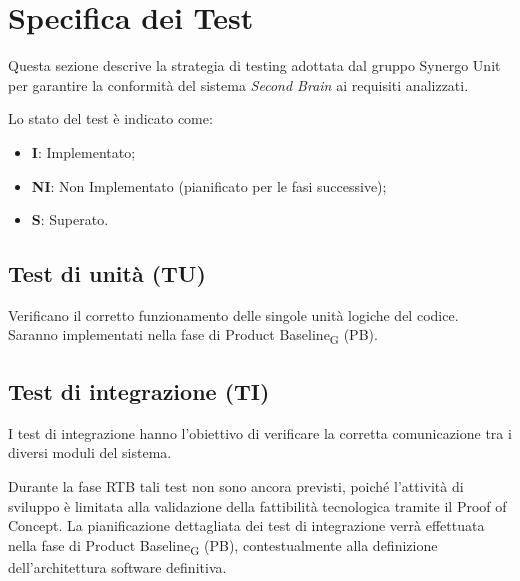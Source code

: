 
\section{Specifica dei Test}
Questa sezione descrive la strategia di testing adottata dal gruppo Synergo Unit per garantire la conformità del sistema \textit{Second Brain} ai requisiti analizzati.

Lo stato del test è indicato come:
\begin{itemize}
    \item \textbf{I}: Implementato;
    \item \textbf{NI}: Non Implementato (pianificato per le fasi successive);
    \item \textbf{S}: Superato.
\end{itemize}

\subsection{Test di unità (TU)}
Verificano il corretto funzionamento delle singole unità logiche del codice. Saranno implementati nella fase di Product Baseline\textsubscript{G} (PB).


\subsection{Test di integrazione (TI)}
I test di integrazione hanno l'obiettivo di verificare la corretta comunicazione tra i diversi moduli del sistema.

Durante la fase RTB tali test non sono ancora previsti, poiché l'attività di sviluppo è limitata alla validazione della fattibilità tecnologica tramite il Proof of Concept. La pianificazione dettagliata dei test di integrazione verrà effettuata nella fase di Product Baseline\textsubscript{G} (PB), contestualmente alla definizione dell'architettura software definitiva. 

